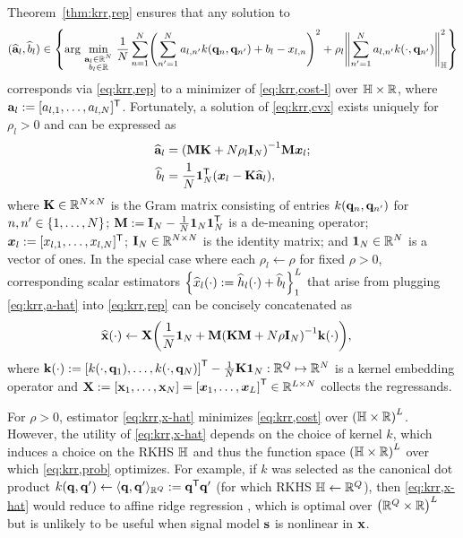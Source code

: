 Theorem~\ref{thm:krr,rep} ensures that any solution to 
\begin{align}
	(\est{\bma}_l,\est{b}_l) \in 
	\set{\argmin{\substack{\bma_l \in \reals{N} \\ b_l \in \real}} 
		\frac{1}{N} \sum_{n=1}^N \paren{\sum_{n'=1}^N a_{l,n'} k(\bmq_n,\bmq_{n'}) 
		+ b_l - x_{l,n}}^2 +
		\rho_l \norm{\sum_{n'=1}^N a_{l,n'} k(\cdot,\bmq_{n'})}^2_\hilb}
	\label{eq:krr,cvx}
\end{align}
corresponds via \eqref{eq:krr,rep} 
to a minimizer of \eqref{eq:krr,cost-l}
over $\mathbb{H} \times \mathbb{R}$,
where $\mathbf{a}_l := [a_{l,1},\dots,a_{l,N}]^{\mathsf{T}}$.
Fortunately, a solution of \eqref{eq:krr,cvx} exists uniquely
for $\rho_l > 0$
and can be expressed as
\begin{align}
	\est{\bma}_l &= \inv{\bmM \bmK + N\rho_l\eye{N}} \bmM \bmxg{l};
	\label{eq:krr,a-hat} \\
	\est{b}_l &= \frac{1}{N} \ones{N}\tpose \paren{\bmxg{l} - \bmK \est{\bma}_l},
	\label{eq:krr,b-hat}
\end{align}
where 
$\mathbf{K} \in \mathbb{R}^{N \times N}$ is the Gram matrix 
consisting of entries $k(\mathbf{q}_n,\mathbf{q}_{n'})$ for $n,n' \in \set{1,\dots,N}$;
$\mathbf{M} := \mathbf{I}_{N}-\frac{1}{N}\boldsymbol{1}_{N}\boldsymbol{1}_{N}^{\mathsf{T}}$ is a de-meaning operator;
$\boldsymbol{x}_{l} := [x_{l,1},\dots,x_{l,N}]^{\mathsf{T}}$;
$\mathbf{I}_{N} \in \mathbb{R}^{N \times N}$ is the identity matrix;
and $\boldsymbol{1}_{N} \in \mathbb{R}^{N}$ is a vector of ones.
In the special case where each
$\rho_l \gets \rho$ 
for fixed $\rho>0$, 
corresponding scalar estimators 
$\set{\est{x}_l\paren{\cdot} := \est{h}_l\paren{\cdot} + \est{b}_l}_1^L$
that arise from plugging \eqref{eq:krr,a-hat} into \eqref{eq:krr,rep}
can be concisely concatenated as
\begin{align}
	\bmxha{\cdot} &\gets \bmX 
		\paren{\frac{1}{N}\ones{N} + 
		\bmM\inv{\bmK\bmM + N\rho\eye{N}} \bmka{\cdot}},
		\label{eq:krr,x-hat}
\end{align}
where
$\bmka{\cdot} := 
\brac{k(\cdot,\bmq_1),\dots,k(\cdot,\bmq_N)}\tpose - \frac{1}{N}\bmK\ones{N}
: \reals{Q} \mapsto \reals{N}$
is a kernel embedding operator and 
$\bmX := \brac{\bmx_1,\dots,\bmx_N} = \brac{\bmxg{1},\dots,\bmxg{L}}\tpose 
\in \reals{L \times N}$
collects the regressands. 

For $\rho>0$, 
estimator \eqref{eq:krr,x-hat} minimizes \eqref{eq:krr,cost}
over $\paren{\hilb \times \real}^L$.
However, the utility of \eqref{eq:krr,x-hat}
depends on the choice of kernel $k$,
which induces a choice on the RKHS $\mathbb{H}$
and thus the function space $\paren{\hilb \times \real}^L$
over which \eqref{eq:krr,prob} optimizes.
For example, if $k$ was selected as the canonical dot product 
$k(\mathbf{q},\mathbf{q}') \gets \langle \mathbf{q},\mathbf{q}' \rangle_{\mathbb{R}^{Q}} := \mathbf{q}^{\mathsf{T}} \mathbf{q}'$
(for which RKHS $\mathbb{H} \gets \mathbb{R}^{Q}$),
then \eqref{eq:krr,x-hat} would reduce 
to affine ridge regression \cite{hoerl:70:rrb},
which is optimal over $\paren{\reals{Q} \times \real}^L$
but is unlikely to be useful when signal model $\mathbf{s}$ is nonlinear in $\mathbf{x}$.


